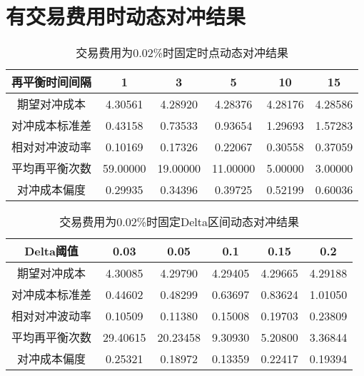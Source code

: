 \chapter{有交易费用时动态对冲结果}
\label{app:sim_fee_result}

\begin{table}[htbp]
  \centering
  \caption{交易费用为0.02\%时固定时点动态对冲结果}
  \label{tab:fixed_time_0.02}
  \begin{tabular}{cccccc}
    \toprule
    再平衡时间间隔 & 1 & 3 & 5 & 10 & 15 \\
    \midrule
    期望对冲成本 & 4.30561 & 4.28920 & 4.28376 & 4.28176 & 4.28586 \\
    对冲成本标准差 & 0.43158 & 0.73533 & 0.93654 & 1.29693 & 1.57283 \\
    相对对冲波动率 & 0.10169 & 0.17326 & 0.22067 & 0.30558 & 0.37059 \\
    平均再平衡次数 & 59.00000 & 19.00000 & 11.00000 & 5.00000 & 3.00000 \\
    对冲成本偏度 & 0.29935 & 0.34396 & 0.39725 & 0.52199 & 0.60036 \\
    \bottomrule
  \end{tabular}
\end{table}

\begin{table}[htbp]
  \centering
  \caption{交易费用为0.02\%时固定Delta区间动态对冲结果}
  \label{tab:fixed_interval_0.02}
  \begin{tabular}{cccccc}
    \toprule
    Delta阈值 & 0.03 & 0.05 & 0.1 & 0.15 & 0.2 \\
    \midrule
    期望对冲成本 & 4.30085 & 4.29790 & 4.29405 & 4.29665 & 4.29188 \\
    对冲成本标准差 & 0.44602 & 0.48299 & 0.63697 & 0.83624 & 1.01050 \\
    相对对冲波动率 & 0.10509 & 0.11380 & 0.15008 & 0.19703 & 0.23809 \\
    平均再平衡次数 & 29.40615 & 20.23458 & 9.30930 & 5.20800 & 3.36844 \\
    对冲成本偏度 & 0.25321 & 0.18972 & 0.13359 & 0.22417 & 0.19394 \\
    \bottomrule
  \end{tabular}
\end{table}

